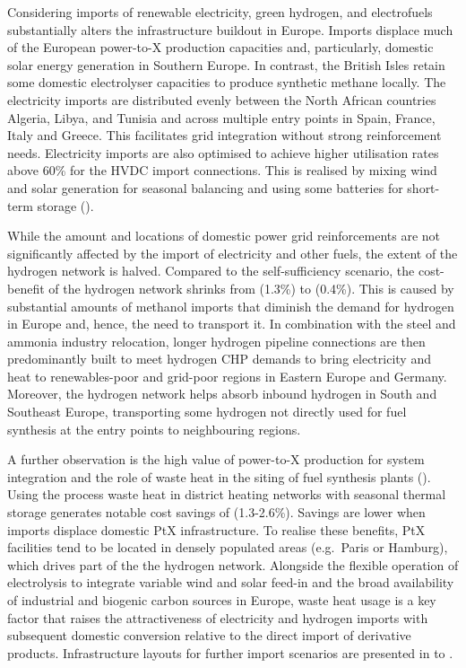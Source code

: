
Considering imports of renewable electricity, green hydrogen, and electrofuels
substantially alters the infrastructure buildout in Europe. Imports displace
much of the European power-to-X production capacities and, particularly,
domestic solar energy generation in Southern Europe. In contrast, the British
Isles retain some domestic electrolyser capacities to produce synthetic methane
locally.
The electricity imports are distributed evenly between the North
African countries Algeria, Libya, and Tunisia and across multiple entry points
in Spain, France, Italy and Greece. This facilitates grid integration without
strong reinforcement needs. Electricity imports are also optimised to achieve
higher utilisation rates above 60\% for the HVDC import connections. This is
realised by mixing wind and solar generation for seasonal balancing and using
some batteries for short-term storage ().

While the amount and locations of domestic power grid reinforcements are not
significantly affected by the import of electricity and other fuels, the extent
of the hydrogen network is halved. Compared to the self-sufficiency scenario,
the cost-benefit of the hydrogen network shrinks from  (1.3\%) to
 (0.4\%).
This is caused by substantial amounts of methanol imports
that diminish the demand for hydrogen in Europe and, hence, the need to
transport it. In combination with the steel and ammonia industry relocation,
longer hydrogen pipeline connections are then predominantly built to meet
hydrogen CHP demands to bring electricity and heat to renewables-poor and
grid-poor regions in Eastern Europe and Germany. Moreover, the hydrogen network
helps absorb inbound hydrogen in South and Southeast Europe, transporting some
hydrogen not directly used for fuel synthesis at the entry points to
neighbouring regions.


A further observation is the high value of power-to-X production for system
integration and the role of waste heat in the siting of fuel synthesis plants
(). Using the process waste heat in district heating
networks with seasonal thermal storage generates notable cost savings of
 (1.3-2.6\%). Savings are lower when imports displace domestic PtX
infrastructure. To realise these benefits, PtX facilities tend to be located in
densely populated areas (e.g.~Paris or Hamburg), which drives part of the the
hydrogen network. Alongside the flexible operation of electrolysis to integrate
variable wind and solar feed-in and the broad availability of industrial and
biogenic carbon sources in Europe, waste heat usage is a key factor that raises
the attractiveness of electricity and hydrogen imports with subsequent domestic
conversion relative to the direct import of derivative products. Infrastructure
layouts for further import scenarios are presented in 
to .

